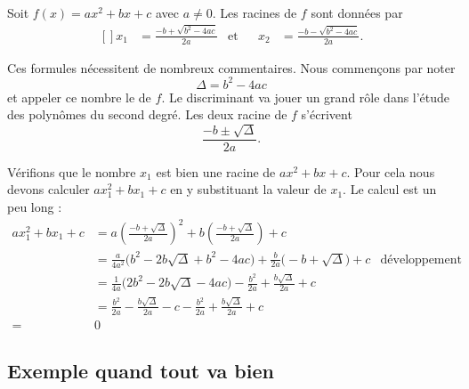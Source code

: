 \begin{Aretenir}
    Soit \( f(x)=ax^2+bx+c\) avec \( a\neq 0\). Les racines de \( f\) sont données par
    \begin{equation}    \label{EqmfNsjE}
        \begin{aligned}[]
            x_1&=\frac{ -b+\sqrt{b^2-4ac} }{ 2a }&\text{et}&&x_2&=\frac{ -b-\sqrt{b^2-4ac} }{ 2a }.
        \end{aligned}
    \end{equation}
\end{Aretenir}
Ces formules nécessitent de nombreux commentaires. Nous commençons par noter
\begin{equation}
    \Delta=b^2-4ac
\end{equation}
et appeler ce nombre le  de \( f\). Le discriminant va jouer un grand rôle dans l'étude des polynômes du second degré. Les deux racine de \( f\) s'écrivent 
\begin{equation}
    \frac{ -b\pm\sqrt{\Delta} }{ 2a }.
\end{equation}

Vérifions que le nombre \( x_1\) est bien une racine de \( ax^2+bx+c\). Pour cela nous devons calculer \( ax_1^2+bx_1+c\) en y substituant la valeur de \( x_1\). Le calcul est un peu long :
\begin{subequations}
    \begin{align}
        ax_1^2+bx_1+c&=a\left( \frac{ -b+\sqrt{\Delta} }{ 2a } \right)^2+b\left( \frac{ -b+\sqrt{\Delta} }{ 2a } \right)+c\\
        &=\frac{ a }{ 4a^2 }\big( b^2-2b\sqrt{\Delta}+b^2-4ac \big)+\frac{ b }{ 2a }\big( -b+\sqrt{\Delta} \big)+c&\text{développement du carré}\\
        &=\frac{1}{ 4a }\big( 2b^2-2b\sqrt{\Delta}-4ac \big)-\frac{ b^2 }{ 2a }+\frac{ b\sqrt{\Delta} }{ 2a }+c\\
        &=\frac{ b^2 }{ 2a }-\frac{ b\sqrt{\Delta} }{ 2a }-c-\frac{ b^2 }{ 2a }+\frac{ b\sqrt{\Delta} }{ 2a }+c\\
        =&0
    \end{align}
\end{subequations}

\subsection{Exemple quand tout va bien}

